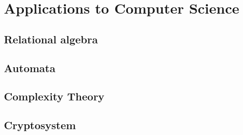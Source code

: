 \documentclass{report}
\theoremstyle{break}
\begin{document}
	\part{Applications to Computer Science}
	
		\chapter{Relational algebra}
			
		
		\chapter{Automata}
			
		
		\chapter{Complexity Theory}
			
		
		\chapter{Cryptosystem}
			
\end{document}
